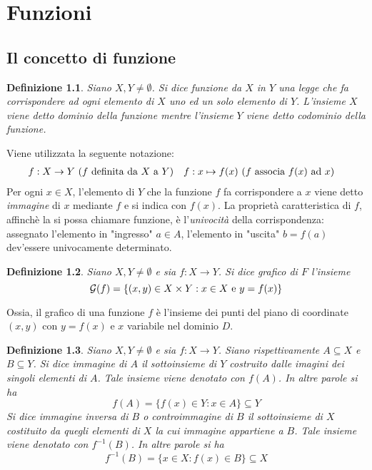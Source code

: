 \documentclass[11pt]{book}
\newtheorem{definition}{Definizione}[chapter]
\begin{document}
\chapter{Funzioni}
\section{Il concetto di funzione}
\begin{definition}
    Siano $X,Y\neq\emptyset$. Si dice funzione da $X$ in $Y$ una legge che fa corrispondere ad ogni elemento di $X$ uno 
    ed un solo elemento di $Y$. L'insieme $X$ viene detto dominio della funzione mentre l'insieme $Y$ viene detto codominio 
    della funzione.
\end{definition}
Viene utilizzata la seguente notazione:
\begin{align*}
    f&:X\rightarrow Y \textnormal{ ($f$ definita da $X$ a $Y$)} & f:x&\mapsto f(x) \textnormal{ ($f$ associa $f(x)$ ad $x$)}
\end{align*}
Per ogni $x\in X$, l'elemento di $Y$ che la funzione $f$ fa corrispondere a $x$ viene detto \textit{immagine} di $x$ 
mediante $f$ e si indica con $f(x)$. La proprietà caratteristica di $f$, affinchè la si possa chiamare funzione, è 
l'\textit{univocità} della corrispondenza: assegnato l'elemento in "ingresso" $a\in A$, l'elemento in "uscita" $b=f(a)$ 
dev'essere univocamente determinato.
\begin{definition}
    Siano $X,Y \neq \emptyset$ e sia $f:X\rightarrow Y$. Si dice grafico di $F$ l'insieme
    \begin{equation*}
        \mathcal{G}(f)=\{(x,y)\in X\times Y:x\in X \textnormal{ e } y=f(x)\}
    \end{equation*}
\end{definition}
Ossia, il grafico di una funzione $f$ è l'insieme dei punti del piano di coordinate $(x,y)$ con $y=f(x)$ e $x$ variabile 
nel dominio $D$.
\begin{definition}
    Siano $X,Y \neq \emptyset$ e sia $f:X\rightarrow Y$. Siano rispettivamente $A\subseteq X$ e $B\subseteq Y$. Si dice 
    immagine di $A$ il sottoinsieme di $Y$ costruito dalle imagini dei singoli elementi di $A$. Tale insieme viene denotato 
    con $f(A)$. In altre parole si ha 
    \begin{equation*}
        f(A)=\{f(x)\in Y:x\in A\}\subseteq Y 
    \end{equation*}
    Si dice immagine inversa di $B$ o controimmagine di $B$ il sottoinsieme di $X$ costituito da quegli elementi di $X$ 
    la cui immagine appartiene a $B$. Tale insieme viene denotato con $f^{-1}(B)$. In altre parole si ha 
    \begin{equation*}
        f^{-1}(B)=\{x\in X:f(x)\in B\}\subseteq X
    \end{equation*}
\end{definition}
\end{document}
